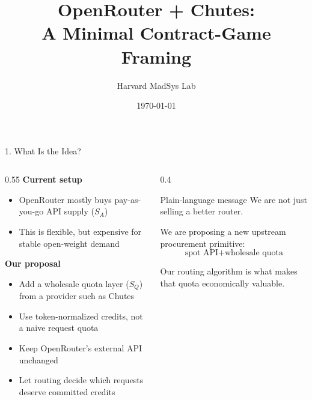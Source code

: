 \documentclass[aspectratio=169,10pt]{beamer}
\title[OpenRouter Contract Game]{OpenRouter + Chutes:\\A Minimal Contract-Game Framing}
\author{Harvard MadSys Lab}
\institute{}
\date{\today}
\begin{document}
\begin{frame}
\titlepage
\end{frame}

\begin{frame}{1. What Is the Idea?}
\begin{columns}[T]
\begin{column}{0.55\textwidth}
\textbf{Current setup}
\begin{itemize}
    \item OpenRouter mostly buys pay-as-you-go API supply ($S_A$)
    \item This is flexible, but expensive for stable open-weight demand
\end{itemize}

\vspace{0.15cm}
\textbf{Our proposal}
\begin{itemize}
    \item Add a wholesale quota layer ($S_Q$) from a provider such as Chutes
    \item Use token-normalized credits, not a naive request quota
    \item Keep OpenRouter's external API unchanged
    \item Let routing decide which requests deserve committed credits
\end{itemize}
\end{column}

\begin{column}{0.4\textwidth}
\begin{block}{Plain-language message}
\small
We are not just selling a better router.

\vspace{0.15cm}
We are proposing a new upstream procurement primitive:
\[
\text{spot API} + \text{wholesale quota}
\]

Our routing algorithm is what makes that quota economically valuable.
\end{block}
\end{column}
\end{columns}
\end{frame}
\end{document}
